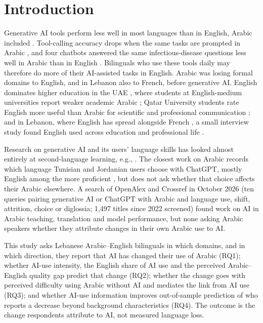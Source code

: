 \documentclass[conference]{IEEEtran}
\begin{document}
\section{Introduction}

Generative AI tools perform less well in most languages than in English, Arabic included \cite{ahuja2023}. Tool-calling accuracy drops when the same tasks are prompted in Arabic \cite{kubrak2025}, and four chatbots answered the same infectious-disease questions less well in Arabic than in English \cite{sallam2024}. Bilinguals who use these tools daily may therefore do more of their AI-assisted tasks in English. Arabic was losing formal domains to English, and in Lebanon also to French, before generative AI. English dominates higher education in the UAE \cite{albataineh2021}, where students at English-medium universities report weaker academic Arabic \cite{masri2019}; Qatar University students rate English more useful than Arabic for scientific and professional communication \cite{mustafawi2022}; and in Lebanon, where English has spread alongside French \cite{esseili2017}, a small interview study found English used across education and professional life \cite{mehio2026}.

Research on generative AI and its users' language skills has looked almost entirely at second-language learning, e.g., \cite{saarela2026}. The closest work on Arabic records which language Tunisian and Jordanian users choose with ChatGPT, mostly English among the more proficient \cite{bouzayenne2026,younes2026}, but does not ask whether that choice affects their Arabic elsewhere. A search of OpenAlex and Crossref in October 2026 (ten queries pairing generative AI or ChatGPT with Arabic and language use, shift, attrition, choice or diglossia; 1,497 titles since 2022 screened) found work on AI in Arabic teaching, translation and model performance, but none asking Arabic speakers whether they attribute changes in their own Arabic use to AI.

This study asks Lebanese Arabic--English bilinguals in which domains, and in which direction, they report that AI has changed their use of Arabic (RQ1); whether AI-use intensity, the English share of AI use and the perceived Arabic--English quality gap predict that change (RQ2); whether the change goes with perceived difficulty using Arabic without AI and mediates the link from AI use (RQ3); and whether AI-use information improves out-of-sample prediction of who reports a decrease beyond background characteristics (RQ4). The outcome is the change respondents attribute to AI, not measured language loss.
\end{document}
